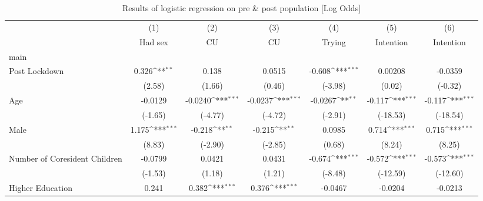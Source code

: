 \begin{table*}[htbp]\centering
\def\sym#1{\ifmmode^{#1}\else\(^{#1}\)\fi}
\caption{Results of logistic regression on pre \& post population [Log Odds]}
\hskip-4.5cm\begin{tabular}{l*{6}{c}}
\hline\hline
                    &\multicolumn{1}{c}{(1)}&\multicolumn{1}{c}{(2)}&\multicolumn{1}{c}{(3)}&\multicolumn{1}{c}{(4)}&\multicolumn{1}{c}{(5)}&\multicolumn{1}{c}{(6)}\\
                    &\multicolumn{1}{c}{Had sex}&\multicolumn{1}{c}{CU}&\multicolumn{1}{c}{CU}&\multicolumn{1}{c}{Trying}&\multicolumn{1}{c}{Intention}&\multicolumn{1}{c}{Intention}\\
\hline
main                &                     &                     &                     &                     &                     &                     \\
Post Lockdown       &       0.326\sym{**} &       0.138         &      0.0515         &      -0.608\sym{***}&     0.00208         &     -0.0359         \\
                    &      (2.58)         &      (1.66)         &      (0.46)         &     (-3.98)         &      (0.02)         &     (-0.32)         \\
[1em]
Age                 &     -0.0129         &     -0.0240\sym{***}&     -0.0237\sym{***}&     -0.0267\sym{**} &      -0.117\sym{***}&      -0.117\sym{***}\\
                    &     (-1.65)         &     (-4.77)         &     (-4.72)         &     (-2.91)         &    (-18.53)         &    (-18.54)         \\
[1em]
Male                &       1.175\sym{***}&      -0.218\sym{**} &      -0.215\sym{**} &      0.0985         &       0.714\sym{***}&       0.715\sym{***}\\
                    &      (8.83)         &     (-2.90)         &     (-2.85)         &      (0.68)         &      (8.24)         &      (8.25)         \\
[1em]
Number of Coresident Children&     -0.0799         &      0.0421         &      0.0431         &      -0.674\sym{***}&      -0.572\sym{***}&      -0.573\sym{***}\\
                    &     (-1.53)         &      (1.18)         &      (1.21)         &     (-8.48)         &    (-12.59)         &    (-12.60)         \\
[1em]
Higher Education    &       0.241         &       0.382\sym{***}&       0.376\sym{***}&     -0.0467         &     -0.0204         &     -0.0213         \\

\end{tabular}
\end{table*}
